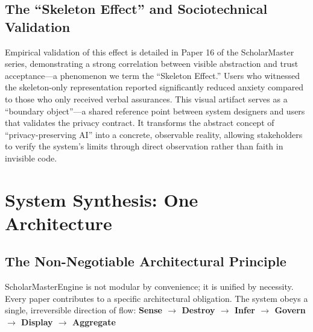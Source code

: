 \documentclass[conference]{IEEEtran}
\begin{document}
\subsection{The ``Skeleton Effect'' and Sociotechnical Validation}
Empirical validation of this effect is detailed in Paper 16 of the ScholarMaster series, demonstrating a strong correlation between visible abstraction and trust acceptance---a phenomenon we term the ``Skeleton Effect.'' Users who witnessed the skeleton-only representation reported significantly reduced anxiety compared to those who only received verbal assurances. This visual artifact serves as a ``boundary object''---a shared reference point between system designers and users that validates the privacy contract. It transforms the abstract concept of ``privacy-preserving AI'' into a concrete, observable reality, allowing stakeholders to verify the system's limits through direct observation rather than faith in invisible code.

\section{System Synthesis: One Architecture}

\subsection{The Non-Negotiable Architectural Principle}
ScholarMasterEngine is not modular by convenience; it is unified by necessity. Every paper contributes to a specific architectural obligation. The system obeys a single, irreversible direction of flow:
\textbf{Sense $\rightarrow$ Destroy $\rightarrow$ Infer $\rightarrow$ Govern $\rightarrow$ Display $\rightarrow$ Aggregate}
\end{document}
